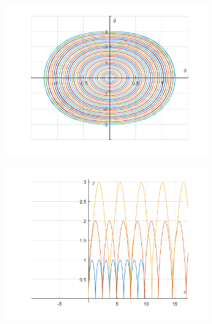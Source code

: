 \documentclass{article}
\begin{document}
	\begin{figure}[h!]
	\graphicspath{{./SmallOscillations/S1} }
	\centering
	\begin{subfigure}[b]{0.48\linewidth}
		\includegraphics[width=\linewidth]{./F5.png}
	\end{subfigure}
	\begin{subfigure}[b]{0.48\linewidth}
		\includegraphics[width=\linewidth]{./F6.png}
	\end{subfigure}
\end{figure}
\end{document}
